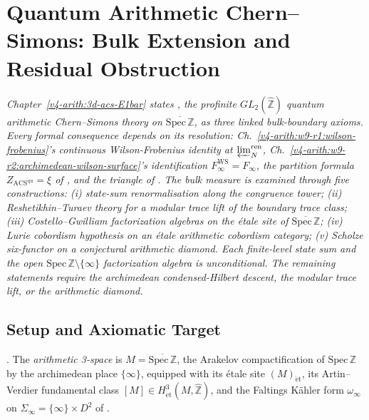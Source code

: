 \chapter{Quantum Arithmetic Chern--Simons: Bulk Extension and Residual Obstruction}
\label{v4-arith:w10-a:chapter}

\emph{Chapter~\ref{v4-arith:3d-acs-E1bar} states
, the profinite
\(GL_{2}(\widehat{\mathbb Z})\) quantum arithmetic Chern--Simons
theory on \(\overline{\mathrm{Spec}\,\mathbb{Z}}\), as three linked
bulk-boundary axioms. Every formal consequence depends on its
resolution: Ch.~\ref{v4-arith:w9-r1:wilson-frobenius}'s continuous
Wilson-Frobenius identity at \(\varprojlim_{N}^{\mathrm{ren}}\),
Ch.~\ref{v4-arith:w9-r2:archimedean-wilson-surface}'s identification
\(F_{\infty}^{\mathrm{WS}}=F_{\infty}\), the partition formula
\(Z_{\mathrm{ACS}^{\mathrm{qu}}}=\xi\) of
, and the triangle of
. The bulk measure is examined through
five constructions: (i) state-sum renormalisation along the congruence
tower; (ii) Reshetikhin--Turaev theory for a modular trace lift of the
boundary trace class; (iii) Costello--Gwilliam factorization algebras on the
\'etale site of \(\overline{\mathrm{Spec}\,\mathbb{Z}}\); (iv) Lurie
cobordism hypothesis on an \'etale arithmetic cobordism category;
(v) Scholze six-functor on a conjectural arithmetic diamond. Each
finite-level state sum and the open
\(\mathrm{Spec}\,\mathbb{Z}\setminus\{\infty\}\) factorization algebra
is unconditional. The remaining statements require the archimedean
condensed-Hilbert descent, the modular trace lift, or the arithmetic
diamond.}

\section{Setup and Axiomatic Target}
\label{v4-arith:w10-a:setup}

\begin{definition}
\label{v4-arith:w10-a:def:3space}
\ClaimStatusDefinitional. The \emph{arithmetic 3-space} is
\(M=\overline{\mathrm{Spec}\,\mathbb Z}\), the Arakelov
compactification of \(\mathrm{Spec}\,\mathbb Z\) by the archimedean
place \(\{\infty\}\), equipped with its \'etale site
\((M)_{\mathrm{\acute et}}\), its Artin--Verdier fundamental class
\([M]\in H^{3}_{\mathrm{\acute et}}(M,\widehat{\mathbb Z})\), and the
Faltings K\"ahler form \(\omega_{\infty}\) on
\(\Sigma_{\infty}=\{\infty\}\times D^{2}\) of
.
\end{definition}

